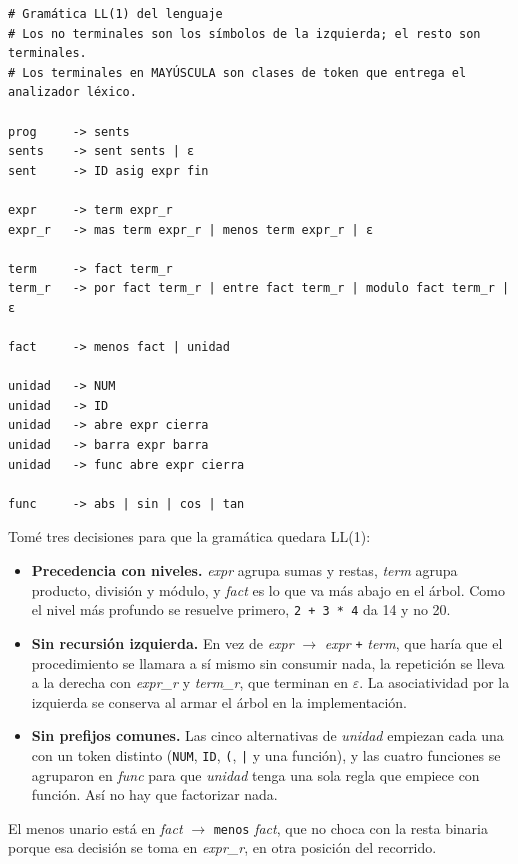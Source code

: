 \documentclass[12pt,letterpaper]{article}
\newcommand{\tk}[1]{\texttt{#1}}
\newcommand{\nt}[1]{\textit{#1}}
\begin{document}
\noindent\begin{minipage}{\linewidth}
\begin{lstlisting}[caption={\texttt{grammars/lenguaje.txt}: la gramática del lenguaje.}]
# Gramática LL(1) del lenguaje
# Los no terminales son los símbolos de la izquierda; el resto son terminales.
# Los terminales en MAYÚSCULA son clases de token que entrega el analizador léxico.

prog     -> sents
sents    -> sent sents | ε
sent     -> ID asig expr fin

expr     -> term expr_r
expr_r   -> mas term expr_r | menos term expr_r | ε

term     -> fact term_r
term_r   -> por fact term_r | entre fact term_r | modulo fact term_r | ε

fact     -> menos fact | unidad

unidad   -> NUM
unidad   -> ID
unidad   -> abre expr cierra
unidad   -> barra expr barra
unidad   -> func abre expr cierra

func     -> abs | sin | cos | tan
\end{lstlisting}
\end{minipage}

Tomé tres decisiones para que la gramática quedara LL(1):

\begin{itemize}
  \item \textbf{Precedencia con niveles.} \nt{expr} agrupa sumas y restas, \nt{term} agrupa producto, división y módulo, y \nt{fact} es lo que va más abajo en el árbol. Como el nivel más profundo se resuelve primero, \tk{2 + 3 * 4} da 14 y no 20.
  \item \textbf{Sin recursión izquierda.} En vez de \nt{expr} $\rightarrow$ \nt{expr} \tk{+} \nt{term}, que haría que el procedimiento se llamara a sí mismo sin consumir nada, la repetición se lleva a la derecha con \nt{expr\_r} y \nt{term\_r}, que terminan en $\varepsilon$. La asociatividad por la izquierda se conserva al armar el árbol en la implementación.
  \item \textbf{Sin prefijos comunes.} Las cinco alternativas de \nt{unidad} empiezan cada una con un token distinto (\tk{NUM}, \tk{ID}, \tk{(}, \tk{|} y una función), y las cuatro funciones se agruparon en \nt{func} para que \nt{unidad} tenga una sola regla que empiece con función. Así no hay que factorizar nada.
\end{itemize}

El menos unario está en \nt{fact} $\rightarrow$ \tk{menos} \nt{fact}, que no choca con la resta binaria porque esa decisión se toma en \nt{expr\_r}, en otra posición del recorrido.
\end{document}
